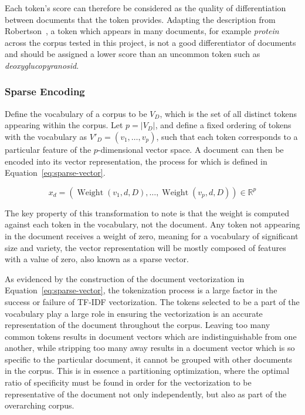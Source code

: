 \documentclass[11pt]{article}
\theoremstyle{plain}
\theoremstyle{definition}
\begin{document}
Each token's score can therefore be considered as the quality of differentiation between documents that the token provides. Adapting the description from Robertson~\cite{robertson/2004/understanding}, a token which appears in many documents, for example \textit{protein} across the corpus tested in this project, is not a good differentiator of documents and should be assigned a lower score than an uncommon token such as \textit{deoxyglucopyranosid}.

\subsubsection{Sparse Encoding}\label{sec:background-lexical-encoding}

Define the vocabulary of a corpus to be $V_D$, which is the set of all distinct tokens appearing within the corpus. Let $p=|V_D|$, and define a fixed ordering of tokens with the vocabulary as $V'_D = (v_1, \dots, v_p)$, such that each token corresponds to a particular feature of the $p$-dimensional vector space. A document can then be encoded into its vector representation, the process for which is defined in Equation~\ref{eq:sparse-vector}.

\begin{equation}\label{eq:sparse-vector}
    x_d = (\operatorname{Weight}(v_1,d,D), \dots , \operatorname{Weight}(v_p,d,D)) \in \mathbb{R}^p
\end{equation}

The key property of this transformation to note is that the weight is computed against each token in the vocabulary, not the document. Any token not appearing in the document receives a weight of zero, meaning for a vocabulary of significant size and variety, the vector representation will be mostly composed of features with a value of zero, also known as a sparse vector.

As evidenced by the construction of the document vectorization in Equation~\ref{eq:sparse-vector}, the tokenization process is a large factor in the success or failure of TF-IDF vectorization. The tokens selected to be a part of the vocabulary play a large role in ensuring the vectorization is an accurate representation of the document throughout the corpus. Leaving too many common tokens results in document vectors which are indistinguishable from one another, while stripping too many away results in a document vector which is so specific to the particular document, it cannot be grouped with other documents in the corpus. This is in essence a partitioning optimization, where the optimal ratio of specificity must be found in order for the vectorization to be representative of the document not only independently, but also as part of the overarching corpus.
\end{document}
